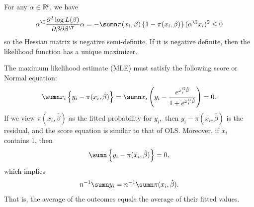 For any $\alpha \in \mathbb{R}^p$, we have
$$
\alpha^{\T}  \frac{\partial^{2}\log L(\beta)}{\partial\beta\partial\beta^{\T}} \alpha
=-\sumn\pi(x_{i},\beta)\left\{ 1-\pi(x_{i},\beta)\right\} (\alpha^{\T} x_{i} )^2 \leq 0
$$
so the Hessian matrix is negative semi-definite.
If it is negative definite, then the likelihood function has a unique maximizer. 

The maximum likelihood estimate (MLE) must satisfy the following score or Normal equation:
\[
\sumn x_{i}\left\{ y_{i}-\pi(x_{i},\hat{\beta})\right\} =\sumn x_{i}\left(y_{i}-\frac{e^{x_{i}^{\T}\hat{\beta}}}{1+e^{x_{i}^{\T}\hat{\beta}}}\right)=0.
\]
If we view $\pi(x_{i},\hat{\beta})$ as the fitted probability
for $y_{i},$ then $y_{i}-\pi(x_{i},\hat{\beta})$ is the residual,
and the score equation is similar to that of OLS. Moreover, if $x_{i}$
contains $1$, then 
\[
\sumn\left\{ y_{i}-\pi(x_{i},\hat{\beta})\right\} =0 ,
\]
which implies
\[ 
n^{-1}\sumn y_{i}=n^{-1}\sumn\pi(x_{i},\hat{\beta}) . 
\]
That is, the average of the outcomes equals the average of their fitted values. 

